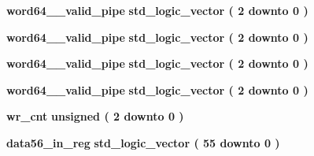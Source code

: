 \begin{DoxyCompactItemize}
\item 
{\bf word64\+\_\+\_\+valid\+\_\+pipe} {\bfseries \textcolor{comment}{std\+\_\+logic\+\_\+vector}\textcolor{vhdlchar}{ }\textcolor{vhdlchar}{(}\textcolor{vhdlchar}{ }\textcolor{vhdlchar}{ } \textcolor{vhdldigit}{2} \textcolor{vhdlchar}{ }\textcolor{keywordflow}{downto}\textcolor{vhdlchar}{ }\textcolor{vhdlchar}{ } \textcolor{vhdldigit}{0} \textcolor{vhdlchar}{ }\textcolor{vhdlchar}{)}\textcolor{vhdlchar}{ }} 
\item 
{\bf word64\+\_\+\_\+valid\+\_\+pipe} {\bfseries \textcolor{comment}{std\+\_\+logic\+\_\+vector}\textcolor{vhdlchar}{ }\textcolor{vhdlchar}{(}\textcolor{vhdlchar}{ }\textcolor{vhdlchar}{ } \textcolor{vhdldigit}{2} \textcolor{vhdlchar}{ }\textcolor{keywordflow}{downto}\textcolor{vhdlchar}{ }\textcolor{vhdlchar}{ } \textcolor{vhdldigit}{0} \textcolor{vhdlchar}{ }\textcolor{vhdlchar}{)}\textcolor{vhdlchar}{ }} 
\item 
{\bf word64\+\_\+\_\+valid\+\_\+pipe} {\bfseries \textcolor{comment}{std\+\_\+logic\+\_\+vector}\textcolor{vhdlchar}{ }\textcolor{vhdlchar}{(}\textcolor{vhdlchar}{ }\textcolor{vhdlchar}{ } \textcolor{vhdldigit}{2} \textcolor{vhdlchar}{ }\textcolor{keywordflow}{downto}\textcolor{vhdlchar}{ }\textcolor{vhdlchar}{ } \textcolor{vhdldigit}{0} \textcolor{vhdlchar}{ }\textcolor{vhdlchar}{)}\textcolor{vhdlchar}{ }} 
\item 
{\bf word64\+\_\+\_\+valid\+\_\+pipe} {\bfseries \textcolor{comment}{std\+\_\+logic\+\_\+vector}\textcolor{vhdlchar}{ }\textcolor{vhdlchar}{(}\textcolor{vhdlchar}{ }\textcolor{vhdlchar}{ } \textcolor{vhdldigit}{2} \textcolor{vhdlchar}{ }\textcolor{keywordflow}{downto}\textcolor{vhdlchar}{ }\textcolor{vhdlchar}{ } \textcolor{vhdldigit}{0} \textcolor{vhdlchar}{ }\textcolor{vhdlchar}{)}\textcolor{vhdlchar}{ }} 
\item 
{\bf wr\+\_\+cnt} {\bfseries \textcolor{comment}{unsigned}\textcolor{vhdlchar}{ }\textcolor{vhdlchar}{(}\textcolor{vhdlchar}{ }\textcolor{vhdlchar}{ } \textcolor{vhdldigit}{2} \textcolor{vhdlchar}{ }\textcolor{keywordflow}{downto}\textcolor{vhdlchar}{ }\textcolor{vhdlchar}{ } \textcolor{vhdldigit}{0} \textcolor{vhdlchar}{ }\textcolor{vhdlchar}{)}\textcolor{vhdlchar}{ }} 
\item 
{\bf data56\+\_\+in\+\_\+reg} {\bfseries \textcolor{comment}{std\+\_\+logic\+\_\+vector}\textcolor{vhdlchar}{ }\textcolor{vhdlchar}{(}\textcolor{vhdlchar}{ }\textcolor{vhdlchar}{ } \textcolor{vhdldigit}{55} \textcolor{vhdlchar}{ }\textcolor{keywordflow}{downto}\textcolor{vhdlchar}{ }\textcolor{vhdlchar}{ } \textcolor{vhdldigit}{0} \textcolor{vhdlchar}{ }\textcolor{vhdlchar}{)}\textcolor{vhdlchar}{ }} 

\end{DoxyCompactItemize}

